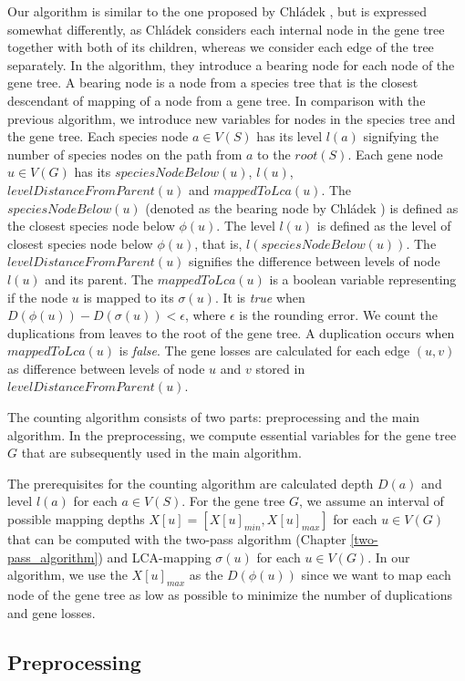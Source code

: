 Our algorithm is similar to the one proposed by Chládek \cite{chladek_thesis}, but is expressed somewhat differently, as Chládek considers each internal node in the gene tree together with both of its children, whereas we consider each edge of the tree separately. In the algorithm, they introduce a bearing node for each node of the gene tree. A bearing node is a node from a species tree that is the closest descendant of mapping of a node from a gene tree. 
In comparison with the previous algorithm, we introduce new variables for nodes in the species tree and the gene tree. Each species node $a \in V(S)$ has its level $l(a)$ signifying the number of species nodes on the path from $a$ to the $root(S)$. Each gene node $u \in V(G)$ has its $speciesNodeBelow(u)$, $l(u)$, $levelDistanceFromParent(u)$ and $mappedToLca(u)$. The $speciesNodeBelow(u)$ (denoted as the bearing node by Chládek \cite{chladek_thesis}) is defined as the closest species node below $\phi(u)$. The level $l(u)$ is defined as the level of closest species node below $\phi(u)$, that is,  $l(speciesNodeBelow(u))$. The $levelDistanceFromParent(u)$ signifies the difference between levels of node $l(u)$ and its parent. The $mappedToLca(u)$ is a boolean variable representing if the node $u$ is mapped to its $\sigma(u)$. It is \emph{true} when $D(\phi(u)) - D(\sigma(u)) < \epsilon$, where $\epsilon$ is the rounding error. We count the duplications from leaves to the root of the gene tree. A duplication occurs when $mappedToLca(u)$ is \emph{false}. The gene losses are calculated for each edge $(u, v)$ as difference between levels of node $u$ and $v$ stored in $levelDistanceFromParent(u)$.

The counting algorithm consists of two parts: preprocessing and the main algorithm. In the preprocessing, we compute essential variables for the gene tree $G$ that are subsequently used in the main algorithm.

The prerequisites for the counting algorithm are calculated depth $D(a)$ and level $l(a)$ for each $a \in V(S)$. For the gene tree $G$, we assume an interval of possible mapping depths $X[u] = [ X[u]_{min}, X[u]_{max} ]$ for each $u \in V(G)$ that can be computed with the two-pass algorithm (Chapter \ref{two-pass_algorithm}) and LCA-mapping $\sigma(u)$ for each $u \in V(G)$. In our algorithm, we use the $X[u]_{max}$ as the $D(\phi(u))$ since we want to map each node of the gene tree as low as possible to minimize the number of duplications and gene losses.

\subsection{Preprocessing} \label{preprocessing}

